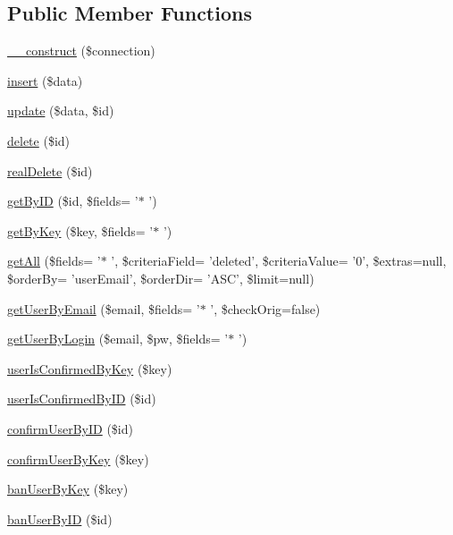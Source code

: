 \subsection*{Public Member Functions}
\begin{DoxyCompactItemize}
\item 
\hyperlink{classusers_a155afedbdfa01f1c0b813ca97642cdab}{\-\_\-\-\_\-construct} (\$connection)
\item 
\hyperlink{classusers_a2e355627d2f4a96559f022c4ab82df3c}{insert} (\$data)
\item 
\hyperlink{classusers_a1d8c1067487068c15fdf6bf9a1c9cad5}{update} (\$data, \$id)
\item 
\hyperlink{classusers_a2f8258add505482d7f00ea26493a5723}{delete} (\$id)
\item 
\hyperlink{classusers_a62e2e537ded1658daab4890c47e65cac}{real\-Delete} (\$id)
\item 
\hyperlink{classusers_a53634d1376ca031c9fb15fc6c414b38d}{get\-By\-I\-D} (\$id, \$fields= '$\ast$ ')
\item 
\hyperlink{classusers_acf08575a3118988b51fb2dac13cfd6d0}{get\-By\-Key} (\$key, \$fields= '$\ast$ ')
\item 
\hyperlink{classusers_a0578082f7a46ccb61c2f76c354790975}{get\-All} (\$fields= '$\ast$ ', \$criteria\-Field= 'deleted', \$criteria\-Value= '0', \$extras=null, \$order\-By= 'user\-Email', \$order\-Dir= 'A\-S\-C', \$limit=null)
\item 
\hyperlink{classusers_ab8f80834945b7c52c4dac242b83890a3}{get\-User\-By\-Email} (\$email, \$fields= '$\ast$ ', \$check\-Orig=false)
\item 
\hyperlink{classusers_a011d89c55eeb9dfb266cc4e1bb08e8ab}{get\-User\-By\-Login} (\$email, \$pw, \$fields= '$\ast$ ')
\item 
\hyperlink{classusers_a6919da8f21e92b94c33bb0510e5d16f7}{user\-Is\-Confirmed\-By\-Key} (\$key)
\item 
\hyperlink{classusers_a527ad71a11a95c657c00269c6a756127}{user\-Is\-Confirmed\-By\-I\-D} (\$id)
\item 
\hyperlink{classusers_a70a112c7f624f303e2fc3cad22c69e80}{confirm\-User\-By\-I\-D} (\$id)
\item 
\hyperlink{classusers_ad909fac2049c67ae141556dcaf6a66c2}{confirm\-User\-By\-Key} (\$key)
\item 
\hyperlink{classusers_a5caeed00e1e3ff2acac3d92a962d3bda}{ban\-User\-By\-Key} (\$key)
\item 
\hyperlink{classusers_a3bed00bbb0e743c0fe5e513bf6695dcd}{ban\-User\-By\-I\-D} (\$id)

\end{DoxyCompactItemize}
